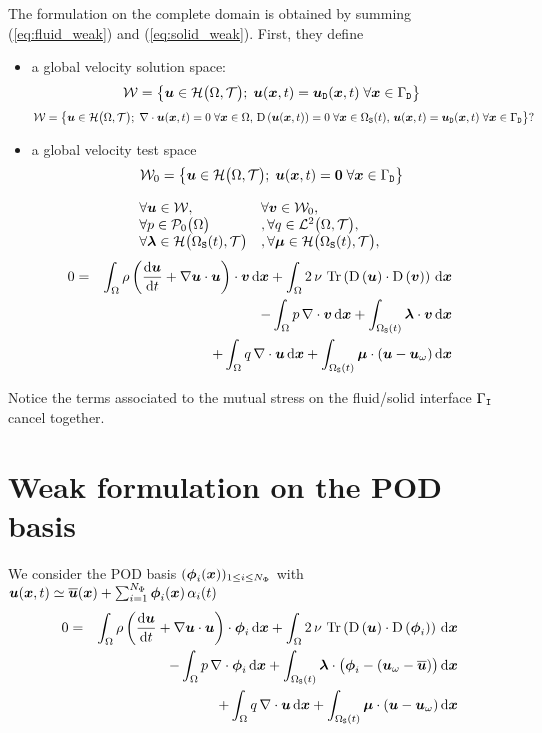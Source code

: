 \documentclass[10pt,a4paper]{article}
\begin{document}
The formulation on the complete domain is obtained by summing (\ref{eq:fluid_weak}) and (\ref{eq:solid_weak}). First, they define
\begin{itemize}
\item a global velocity solution space: 
$$\sW = \left\{\vu \in \sH\big(\dom, \sT\big);\;\vu(\vx, t) = \vud(\vx, t)\; \forall \vx \in \boud \right\}$$
$$\sW = \left\{\vu \in \sH\big(\dom, \sT\big);\;\div \vu(\vx, t)=0\; \forall \vx \in \dom,\,\D{\vu(\vx, t)}=0\; \forall \vx \in \doms(t),\,\vu(\vx, t) = \vud(\vx, t)\; \forall \vx \in \boud \right\}?$$
\item a global velocity test space 
$$\sW_0 = \left\{\vu \in \sH\big(\dom, \sT\big);\;\vu(\vx, t) = \vec 0 \; \forall \vx \in \boud \right\}$$
\end{itemize}
$$
\begin{array}{ll}
\forall \vu \in \sW, & \forall \vv \in \sW_0, \\
\forall p \in \sP_0\big(\dom\big) &,  \forall q \in \sL^2\big(\dom, \sT\big), \\
\forall \vlambda \in \sH\big(\doms(t),\sT\big)&,  \forall \vmu \in \sH\big(\doms(t),\sT\big), \\
\end{array}
$$
\begin{eqnarray}
\nonumber 0 &=& 
\int_{\dom}\rho\left(\dt \vu + \grad \vu \cdot \vu\right)\cdot\vv \,\d\vx + \int_{\dom}2\,\nu\,\trace{\D{\vu}\cdot\D{\vv}} \, \d\vx\\
\nonumber & & - \int_{\dom} p\,\div \vv \,\d\vx + \int_{\doms(t)} \vlambda \cdot \vv \, \d \vx \\
\label{eq:solid_weak} & & + \int_{\dom} q\,\div \vu \,\d\vx + \int_{\doms(t)}\vmu \cdot (\vu-\vuo)\,\d \vx
\end{eqnarray}
%

Notice the terms associated to the mutual stress on the fluid/solid interface $\boui$ cancel together.
%

\section{Weak formulation on the POD basis}
We consider the POD basis $(\vphi_i(\vx))_{1 \leq i \leq N_\Phi}$ with $\vu(\vx, t)\simeq \bu(\vx) + \sum_{i=1}^{N_\Phi}\vphi_i(\vx)\,\alpha_i(t)$
\begin{eqnarray}
\nonumber 0 &=& 
\int_{\dom}\rho\left(\dt \vu + \grad \vu \cdot \vu\right)\cdot\vphi_i \,\d\vx 
+ \int_{\dom}2\,\nu\,\trace{\D{\vu}\cdot\D{\vphi_i}} \, \d\vx\\
\nonumber & & 
- \int_{\dom} p\,\div \vphi_i \,\d\vx 
+ \int_{\doms(t)} \vlambda \cdot \big(\vphi_i-(\vuo-\bu)\big) \, \d \vx \\
\label{eq:solid_weak} & & 
+ \int_{\dom} q\,\div \vu \,\d\vx 
+ \int_{\doms(t)}\vmu \cdot (\vu-\vuo)\,\d \vx
\end{eqnarray}
%
%
%
\end{document}
